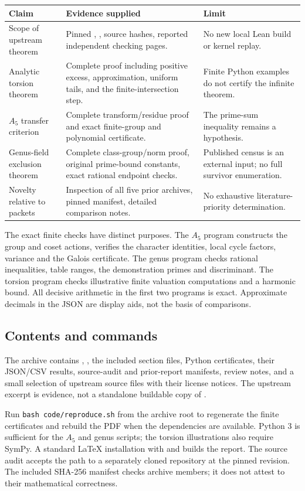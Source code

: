 \begin{center}
\small
\begin{tabularx}{\textwidth}{@{}p{49mm}YY@{}}
\toprule
Claim & Evidence supplied & Limit\\
\midrule
Scope of upstream theorem &
Pinned , , source hashes,
reported independent checking pages. &
No new local Lean build or kernel replay.\\
\addlinespace
Analytic torsion theorem &
Complete proof including positive excess, approximation, uniform tails,
and the finite-intersection step. &
Finite Python examples do not certify the infinite theorem.\\
\addlinespace
\(A_5\) transfer criterion &
Complete transform/residue proof and exact finite-group and polynomial
certificate. &
The prime-sum inequality remains a hypothesis.\\
\addlinespace
Genus-field exclusion theorem &
Complete class-group/norm proof, original prime-bound constants, exact
rational endpoint checks. &
Published census is an external input; no full survivor enumeration.\\
\addlinespace
Novelty relative to packets &
Inspection of all five prior archives, pinned manifest, detailed
comparison notes. &
No exhaustive literature-priority determination.\\
\bottomrule
\end{tabularx}
\end{center}

The exact finite checks have distinct purposes. The \(A_5\) program
constructs the group and coset actions, verifies the character identities,
local cycle factors, variance and the Galois certificate. The genus
program checks rational inequalities, table ranges, the demonstration
primes and discriminant. The torsion program checks illustrative finite
valuation computations and a harmonic bound. All decisive arithmetic in
the first two programs is exact. Approximate decimals in the JSON are
display aids, not the basis of comparisons.

\subsection{Contents and commands}

The archive contains , , the included
section files, Python certificates, their JSON/CSV results,
source-audit and prior-report manifests, review notes, and a small
selection of upstream source files with their license notices.
The upstream excerpt is evidence, not a standalone buildable copy of
\repo.

Run \texttt{bash code/reproduce.sh} from the archive root to regenerate
the finite certificates and rebuild the PDF when the dependencies are
available. Python 3 is sufficient for the \(A_5\) and genus scripts;
the torsion illustrations also require SymPy. A standard LaTeX installation
with  and  builds the report. The source audit
accepts the path to a separately cloned repository at the pinned revision.
The included SHA-256 manifest checks archive members; it does not attest
to their mathematical correctness.

